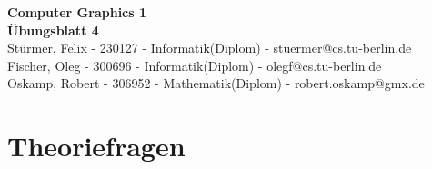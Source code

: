 \documentclass[a4paper,10pt]{scrartcl}
\begin{document}
 \begin{center}
{\huge \bfseries Computer Graphics 1\\[0.5cm]Übungsblatt 4}\\[1.0cm]
  
  Stürmer, Felix - 230127 - Informatik(Diplom) - stuermer@cs.tu-berlin.de\\
  Fischer, Oleg - 300696 - Informatik(Diplom) - olegf@cs.tu-berlin.de\\
  Oskamp, Robert - 306952 - Mathematik(Diplom) - robert.oskamp@gmx.de\\[2.0cm]
 \end{center}
\section{Theoriefragen}
\end{document}

